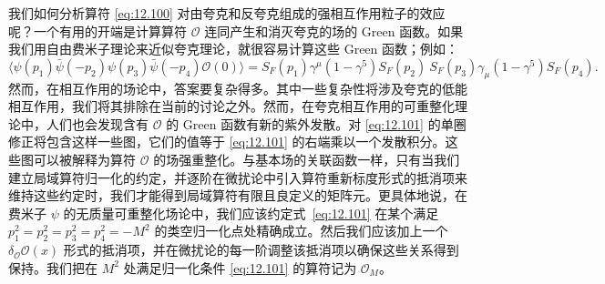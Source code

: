 我们如何分析算符 \eqref{eq:12.100} 对由夸克和反夸克组成的强相互作用粒子的效应呢？一个有用的开端是计算算符 $\mathcal{O}$ 连同产生和消灭夸克的场的 Green 函数。如果我们用自由费米子理论来近似夸克理论，就很容易计算这些 Green 函数；例如：
\begin{equation}
  \langle\psi(p_1)\bar{\psi}(-p_2)\psi(p_3)\bar{\psi}(-p_4)
    \mathcal{O}(0)\rangle
  = S_F(p_1)\gamma^\mu(1-\gamma^5)S_F(p_2)\ S_F(p_3)\gamma_\mu(1-\gamma^5)
    S_F(p_4) .
  \label{eq:12.101}
\end{equation}
然而，在相互作用的场论中，答案要复杂得多。其中一些复杂性将涉及夸克的低能相互作用，我们将其排除在当前的讨论之外。然而，在夸克相互作用的可重整化理论中，人们也会发现含有 $\mathcal{O}$ 的 Green 函数有新的紫外发散。对 \eqref{eq:12.101} 的单圈修正将包含这样一些图，它们的值等于 \eqref{eq:12.101} 的右端乘以一个发散积分。这些图可以被解释为算符 $\mathcal{O}$ 的场强重整化。与基本场的关联函数一样，只有当我们建立局域算符归一化的约定，并逐阶在微扰论中引入算符重新标度形式的抵消项来维持这些约定时，我们才能得到局域算符有限且良定义的矩阵元。更具体地说，在费米子 $\psi$ 的无质量可重整化场论中，我们应该约定式~\eqref{eq:12.101} 在某个满足 $p_1^2 = p_2^2 = p_3^2 = p_4^2 = -M^2$ 的类空归一化点处精确成立。然后我们应该加上一个 $\delta_{\mathcal{O}}\mathcal{O}(x)$ 形式的抵消项，并在微扰论的每一阶调整该抵消项以确保这些关系得到保持。我们把在 $M^2$ 处满足归一化条件 \eqref{eq:12.101} 的算符记为 $\mathcal{O}_M$。

